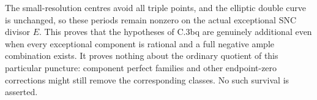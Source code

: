 The small-resolution centres avoid all triple points, and the
elliptic double curve is unchanged, so these periods remain
nonzero on the actual exceptional SNC divisor $E$.
This proves that the hypotheses of C.3bq are genuinely additional
even when every exceptional component is rational and a full
negative ample combination exists. It proves nothing about the
ordinary quotient of this particular puncture: component perfect
families and other endpoint-zero corrections might still remove
the corresponding classes. No such survival is asserted.
